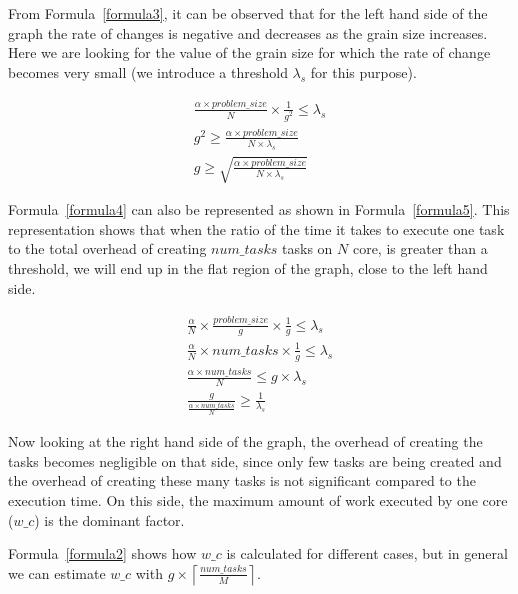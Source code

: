 From Formula~\ref{formula3}, it can be observed that for the left hand side of the graph the rate of changes is negative and decreases as the grain size increases. Here we are looking for the value of the grain size for which the rate of change becomes very small (we introduce a threshold $\lambda_s$ for this purpose). 


\begin{equation}\label{formula4}
\begin{aligned}
\frac{\alpha\times{problem\_{size}}}{N}\times{\frac{1}{g^2}}\leq{\lambda_s} \\
{g^2}\geq{\frac{\alpha\times{problem\_{size}}}{N\times{\lambda_s}}}\\
{g}\geq{\sqrt{\frac{\alpha\times{problem\_{size}}}{N\times{\lambda_s}}}}
\end{aligned}
\end{equation}

Formula~\ref{formula4} can also be represented as shown in Formula~\ref{formula5}. This representation shows that when the ratio of the time it takes to execute one task to the total overhead of creating $num\_{tasks}$ tasks on $N$ core, is greater than a threshold, we will end up in the flat region of the graph, close to the left hand side.


\begin{equation}\label{formula5}
\begin{aligned}
\frac{\alpha}{N}\times{\frac{problem\_{size}}{g}}\times{\frac{1}{g}}\leq{\lambda_s} \\
\frac{\alpha}{N}\times{num\_{tasks}}\times{\frac{1}{g}}\leq{\lambda_s}\\
\frac{\alpha\times{num\_{tasks}}}{N}\leq{g\times\lambda_s}\\	
\frac{g}{\frac{\alpha\times{num\_{tasks}}}{N}}\geq{\frac{1}{\lambda_s}}
\end{aligned}
\end{equation}


Now looking at the right hand side of the graph, the overhead of creating the tasks becomes negligible on that side, since only few tasks are being created and the overhead of creating these many tasks is not significant compared to the execution time. On this side, the maximum amount of work executed by one core ($w\_c$) is the dominant factor.

Formula~\ref{formula2} shows how $w\_c$ is calculated for different cases, but in general we can estimate $w\_c$ with $g\times\left \lceil{\frac{num\_{tasks}}{M}}\right \rceil$. 

